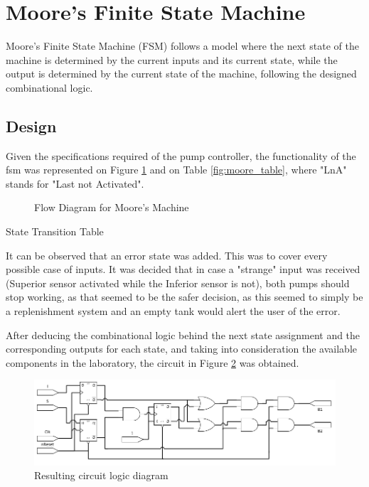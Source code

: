 \section{Moore's Finite State Machine}

Moore's Finite State Machine (FSM) follows a model where the next state of the machine is determined by the current
inputs and its current state, while the output is determined by the current state of the machine, following the
designed combinational logic.

\subsection{Design}

Given the specifications required of the pump controller, the functionality of the fsm was represented
on Figure \ref{fig:moore_flow} and on Table \ref{fig:moore_table}, where "LnA" stands for "Last not Activated".

\begin{figure}[h]
    \begin{center}
        
        \caption{Flow Diagram for Moore's Machine}
        \label{fig:moore_flow}
    \end{center}
\end{figure}

\begin{table}[ht]
    \begin{center}
        
        \caption{State Transition Table}
        \label{fig:moore_table}
    \end{center}
\end{table}

It can be observed that an error state was added. This was to cover every possible case of inputs. It was decided that
in case a "strange" input was received (Superior sensor activated while the Inferior sensor is not), both pumps should
stop working, as that seemed to be the safer decision, as this seemed to simply be a replenishment system and an empty
tank would alert the user of the error.

After deducing the combinational logic behind the next state assignment and the corresponding outputs for each state,
and taking into consideration the available components in the laboratory, the circuit in Figure \ref{fig:moore_circuit}
was obtained.

\begin{figure}
    \begin{center}
        \includegraphics[width=\linewidth]{circuit.png}
        \caption{Resulting circuit logic diagram}
        \label{fig:moore_circuit}
    \end{center}
\end{figure}

